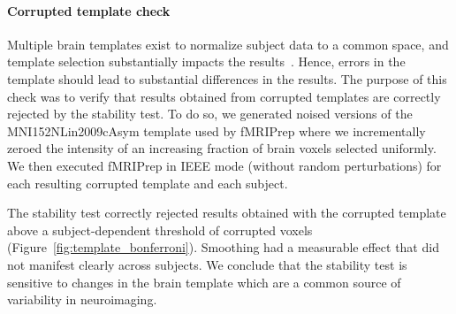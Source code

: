 \documentclass[lettersize,journal]{IEEEtran}
\newcommand{\TG}[1]{\color{blue}\textsc{From Tristan:} #1\color{black}\xspace}
\newcommand{\fmriprep}{fMRIPrep\xspace}
\begin{document}
\paragraph{Corrupted template check}

Multiple brain templates exist to normalize subject data to a common space, and template selection substantially impacts the results~\cite{li2021moving}. Hence, errors in the template should lead to substantial differences in the results. The purpose of this check was to verify that results obtained from corrupted templates are correctly rejected by the stability test.
To do so, we generated noised versions of the MNI152NLin2009cAsym template used by \fmriprep where we incrementally zeroed the intensity of an increasing fraction of brain voxels selected uniformly. We then executed \fmriprep in IEEE mode (without random perturbations) for each resulting corrupted template and each subject.

The stability test correctly rejected results obtained with the corrupted template above a subject-dependent threshold of corrupted voxels (Figure~\ref{fig:template_bonferroni}). Smoothing had a measurable effect that did not manifest clearly across subjects. We conclude that the stability test is sensitive to changes in the brain template which are a common source of variability in neuroimaging.

\end{document}
